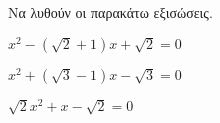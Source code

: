 Να λυθούν οι παρακάτω εξισώσεις.
\begin{multicols}{3}
\begin{alist}
\item $ x^2-(\sqrt{2}+1)x+\sqrt{2}=0 $
\item $ x^2+(\sqrt{3}-1)x-\sqrt{3}=0 $
\item $ \sqrt{2}x^2+x-\sqrt{2}=0 $
\end{alist}
\end{multicols}
